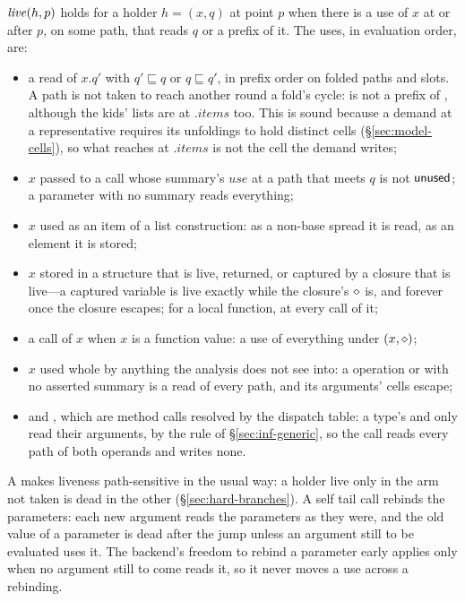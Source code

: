$\mathit{live}(h, p)$ holds for a holder $h = (x, q)$ at point $p$ when there is a use of $x$ at or after $p$,
on some path, that reads $q$ or a prefix of it. The uses, in evaluation order, are:
\begin{itemize}
\item a read of $x.q'$ with $q' \sqsubseteq q$ or $q \sqsubseteq q'$, in prefix order on folded paths and
slots. A path is not taken to reach another round a fold's cycle:  is not a prefix of
, although the kids' lists are at $.\mathit{items}$ too. This is sound because a demand at a
representative requires its unfoldings to hold distinct cells (\S\ref{sec:model-cells}), so what
 reaches at $.\mathit{items}$ is not the cell the demand writes;
\item $x$ passed to a call whose summary's $\mathit{use}$ at a path that meets $q$ is not $\mathsf{unused}$; a
parameter with no summary reads everything;
\item $x$ used as an item of a list construction: as a non-base spread it is read, as an element it is
stored;
\item $x$ stored in a structure that is live, returned, or captured by a closure that is live---a
captured variable is live exactly while the closure's $\diamond$ is, and forever once the closure
escapes; for a local function, at every call of it;
\item a call of $x$ when $x$ is a function value: a use of everything under $(x, \diamond)$;
\item $x$ used whole by anything the analysis does not see into: a  operation or
 with no asserted summary is a read of every path, and its arguments' cells escape;
\item \code{==} and \code{<}, which are method calls resolved by the dispatch table: a type's 
and  only read their arguments, by the rule of \S\ref{sec:inf-generic}, so the call
reads every path of both operands and writes none.
\end{itemize}
A  makes liveness path-sensitive in the usual way: a holder live only in the arm not
taken is dead in the other (\S\ref{sec:hard-branches}). A self tail call rebinds the parameters: each
new argument reads the parameters as they were, and the old value of a parameter is dead after the
jump unless an argument still to be evaluated uses it. The backend's freedom to rebind a parameter
early applies only when no argument still to come reads it, so it never moves a use across a rebinding.

